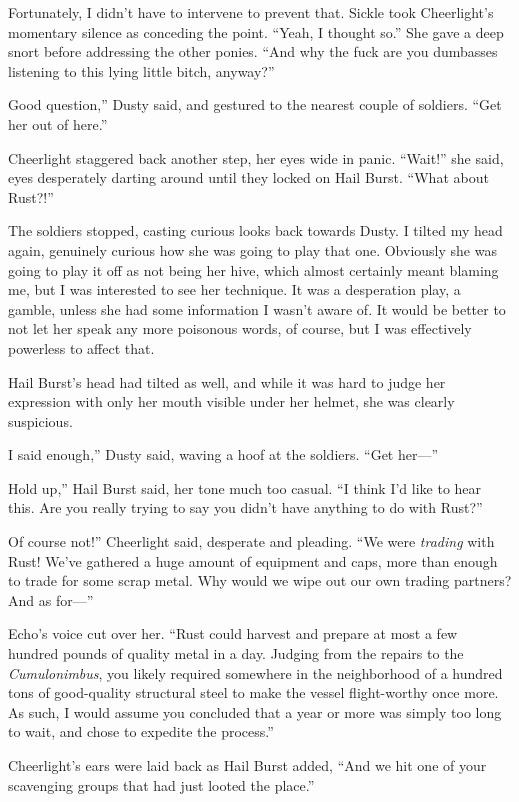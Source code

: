 Fortunately, I didn’t have to intervene to prevent that. Sickle took Cheerlight’s momentary silence as conceding the point. “Yeah, I thought so.” She gave a deep snort before addressing the other ponies. “And why the fuck are you dumbasses listening to this lying little bitch, anyway?”

\leavevmode{}Good question,” Dusty said, and gestured to the nearest couple of soldiers. “Get her out of here.”

Cheerlight staggered back another step, her eyes wide in panic. “Wait!” she said, eyes desperately darting around until they locked on Hail Burst. “What about Rust?!”

The soldiers stopped, casting curious looks back towards Dusty. I tilted my head again, genuinely curious how she was going to play that one. Obviously she was going to play it off as not being her hive, which almost certainly meant blaming me, but I was interested to see her technique. It was a desperation play, a gamble, unless she had some information I wasn’t aware of. It would be better to not let her speak any more poisonous words, of course, but I was effectively powerless to affect that.

Hail Burst’s head had tilted as well, and while it was hard to judge her expression with only her mouth visible under her helmet, she was clearly suspicious.

\leavevmode{}I said enough,” Dusty said, waving a hoof at the soldiers. “Get her—”

\leavevmode{}Hold up,” Hail Burst said, her tone much too casual. “I think I’d like to hear this. Are you really trying to say you didn’t have anything to do with Rust?”

\leavevmode{}Of course not!” Cheerlight said, desperate and pleading. “We were \textit{trading} with Rust! We’ve gathered a huge amount of equipment and caps, more than enough to trade for some scrap metal. Why would we wipe out our own trading partners? And as for—”

Echo’s voice cut over her. “Rust could harvest and prepare at most a few hundred pounds of quality metal in a day. Judging from the repairs to the \textit{Cumulonimbus}, you likely required somewhere in the neighborhood of a hundred tons of good-quality structural steel to make the vessel flight-worthy once more. As such, I would assume you concluded that a year or more was simply too long to wait, and chose to expedite the process.”

Cheerlight’s ears were laid back as Hail Burst added, “And we hit one of your scavenging groups that had just looted the place.”


